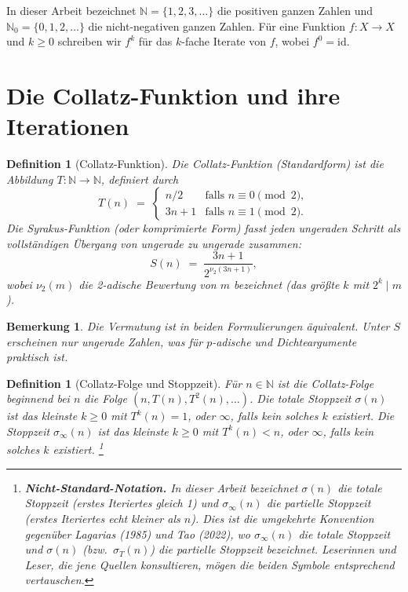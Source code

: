 \documentclass[12pt,a4paper]{article}
\newtheorem{definition}[theorem]{Definition}
\newtheorem{remark}[theorem]{Bemerkung}
\begin{document}
In dieser Arbeit bezeichnet $\mathbb{N} = \{1, 2, 3, \ldots\}$ die positiven ganzen
Zahlen und $\mathbb{N}_0 = \{0, 1, 2, \ldots\}$ die nicht-negativen ganzen Zahlen.
Für eine Funktion $f\colon X \to X$ und $k \geq 0$ schreiben wir $f^k$ für das
$k$-fache Iterate von $f$, wobei $f^0 = \mathrm{id}$.

\section{Die Collatz-Funktion und ihre Iterationen}

\begin{definition}[Collatz-Funktion]\label{def:collatz}
Die \emph{Collatz-Funktion} (Standardform) ist die Abbildung $T\colon \mathbb{N} \to \mathbb{N}$,
definiert durch
\[
  T(n) \;=\; \begin{cases} n/2 & \text{falls } n \equiv 0 \pmod{2}, \\
                            3n+1 & \text{falls } n \equiv 1 \pmod{2}.
              \end{cases}
\]
Die \emph{Syrakus-Funktion} (oder komprimierte Form) fasst jeden ungeraden Schritt als
vollständigen Übergang von ungerade zu ungerade zusammen:
\[
  S(n) \;=\; \frac{3n+1}{2^{\nu_2(3n+1)}},
\]
wobei $\nu_2(m)$ die 2-adische Bewertung von $m$ bezeichnet (das größte $k$ mit $2^k \mid m$).
\end{definition}

\begin{remark}\label{rem:equivalent}
Die Vermutung ist in beiden Formulierungen äquivalent. Unter $S$ erscheinen nur ungerade
Zahlen, was für $p$-adische und Dichteargumente praktisch ist.
\end{remark}

\begin{definition}[Collatz-Folge und Stoppzeit]\label{def:sequence}
Für $n \in \mathbb{N}$ ist die \emph{Collatz-Folge} beginnend bei $n$ die Folge
$(n, T(n), T^2(n), \ldots)$.
Die \emph{totale Stoppzeit} $\sigma(n)$ ist das kleinste $k \geq 0$ mit $T^k(n) = 1$,
oder $\infty$, falls kein solches $k$ existiert.
Die \emph{Stoppzeit} $\sigma_\infty(n)$ ist das kleinste $k \geq 0$ mit $T^k(n) < n$,
oder $\infty$, falls kein solches $k$ existiert.%
\footnote{%
  \textbf{Nicht-Standard-Notation.} In dieser Arbeit bezeichnet $\sigma(n)$ die
  \emph{totale} Stoppzeit (erstes Iteriertes gleich 1) und $\sigma_\infty(n)$
  die \emph{partielle} Stoppzeit (erstes Iteriertes echt kleiner als $n$).
  Dies ist die \emph{umgekehrte} Konvention gegenüber Lagarias (1985) und
  Tao (2022), wo $\sigma_\infty(n)$ die totale Stoppzeit und $\sigma(n)$
  (bzw.\ $\sigma_T(n)$) die partielle Stoppzeit bezeichnet.
  Leserinnen und Leser, die jene Quellen konsultieren, mögen die beiden Symbole
  entsprechend vertauschen.%
}
\end{definition}
\end{document}
